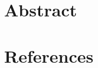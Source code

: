 \documentclass[12pt,a4paper,oneside,pdftex]{report}
\begin{document}
\title{\TITLE}
\AUTHOR

\chapter{Abstract}
\ABSTRACTEN















\chapter{References}
\end{document}
